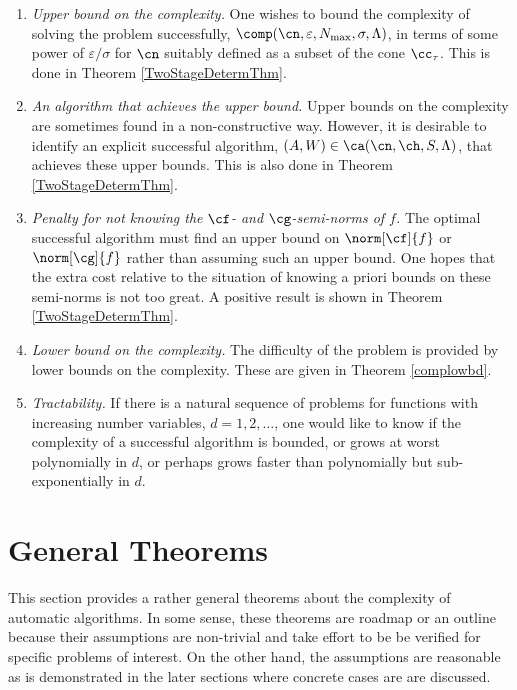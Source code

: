 \documentclass[final]{elsarticle}
\theoremstyle{definition}
\theoremstyle{remark}
\begin{document}
\begin{enumerate}

\renewcommand{\labelenumi}{\roman{enumi}.}

\item \emph{Upper bound on the complexity.}
One wishes to bound the complexity of solving the problem successfully, $\comp(\cn,\varepsilon,N_{\max},\sigma,\Lambda)$, in terms of some power of $\varepsilon/\sigma$ for $\cn$ suitably defined as a subset of the cone $\cc_{\tau}$.  This is done in Theorem \ref{TwoStageDetermThm}.

\item \emph{An algorithm that achieves the upper bound.}  Upper bounds on the complexity are sometimes found in a non-constructive way.  However, it is desirable to identify an explicit successful algorithm, $(A,W) \in \ca(\cn,\ch,S,\Lambda)$, that achieves these upper bounds.  This is also done in Theorem \ref{TwoStageDetermThm}.

\item \emph{Penalty for not knowing the $\cf$- and $\cg$-semi-norms of $f$.} The optimal successful algorithm must find an upper bound on $\norm[\cf]{f}$ or $\norm[\cg]{f}$ rather than assuming such an upper bound.  One hopes that the extra cost relative to the situation of knowing a priori bounds on these semi-norms is not too great.  A positive result is shown in Theorem \ref{TwoStageDetermThm}.

\item \emph{Lower bound on the complexity.}  The difficulty of the problem is provided by lower bounds on the complexity.  These are given in Theorem \ref{complowbd}.

\item \emph{Tractability.}  If there is a natural sequence of problems for functions with increasing number variables, $d=1, 2, \ldots$, one would like to know if the complexity of a successful algorithm is bounded, or grows at worst polynomially in $d$, or perhaps grows faster than polynomially but sub-exponentially in $d$.

\end{enumerate}

\section{General Theorems}

This section provides a rather general theorems about the complexity of automatic algorithms.  In some sense, these theorems are roadmap or an outline because their assumptions are non-trivial and take effort to be be verified for specific problems of interest.  On the other hand, the assumptions are reasonable as is demonstrated in the later sections where concrete cases are are discussed.  
\end{document}
